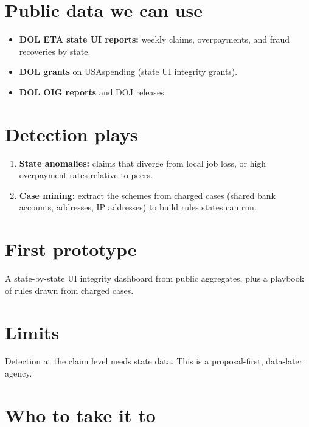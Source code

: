 \documentclass[letterpaper,11pt]{article}
\providecommand{\tightlist}{\setlength{\itemsep}{0pt}\setlength{\parskip}{0pt}}
\begin{document}
\hypertarget{public-data-we-can-use}{%
\section{Public data we can use}\label{public-data-we-can-use}}

\begin{itemize}
\tightlist
\item
  \textbf{DOL ETA state UI reports:} weekly claims, overpayments, and
  fraud recoveries by state.
\item
  \textbf{DOL grants} on USAspending (state UI integrity grants).
\item
  \textbf{DOL OIG reports} and DOJ releases.
\end{itemize}

\hypertarget{detection-plays}{%
\section{Detection plays}\label{detection-plays}}

\begin{enumerate}
\def\labelenumi{\arabic{enumi}.}
\tightlist
\item
  \textbf{State anomalies:} claims that diverge from local job loss, or
  high overpayment rates relative to peers.
\item
  \textbf{Case mining:} extract the schemes from charged cases (shared
  bank accounts, addresses, IP addresses) to build rules states can run.
\end{enumerate}

\hypertarget{first-prototype}{%
\section{First prototype}\label{first-prototype}}

A state-by-state UI integrity dashboard from public aggregates, plus a
playbook of rules drawn from charged cases.

\hypertarget{limits}{%
\section{Limits}\label{limits}}

Detection at the claim level needs state data. This is a proposal-first,
data-later agency.

\hypertarget{who-to-take-it-to}{%
\section{Who to take it to}\label{who-to-take-it-to}}
\end{document}
